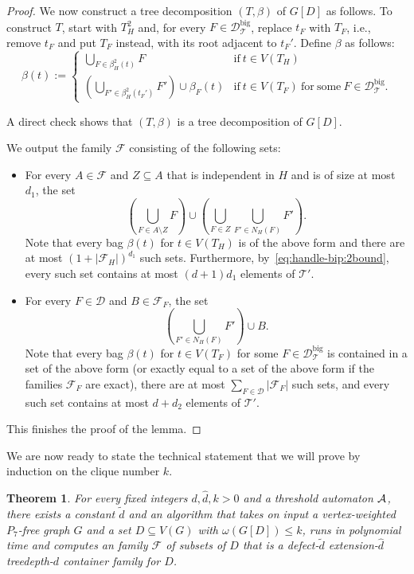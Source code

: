 \documentclass[11pt,a4paper]{article}
\newtheorem{theorem}{Theorem}[section]
\theoremstyle{definition}
\def\T{\mathcal{T}}
\begin{document}
\begin{proof}
We now construct a tree decomposition $(T,\beta)$ of $G[D]$ as follows. 
To construct $T$, start with $T_H^2$ and, for every $F \in \mathcal{D}^\mathrm{big}_\T$, replace $t_F$ with $T_F$, i.e., 
   remove $t_F$ and put $T_F$ instead, with its root adjacent to $t_F'$.
Define $\beta$ as follows:
\[ \beta(t) := \begin{cases} \bigcup_{F \in \beta_H^2(t)} F & \mathrm{if}\ t \in V(T_H) \\
                \left( \bigcup_{F' \in \beta_H^2(t_F')} F' \right) \cup \beta_F(t) & \mathrm{if}\ t \in V(T_F)\ \mathrm{for\ some\ }F \in \mathcal{D}^\mathrm{big}_\T.\end{cases} \]

A direct check shows that $(T,\beta)$ is a tree decomposition of $G[D]$. 

We output the family $\mathcal{F}$ consisting of the following sets:
\begin{itemize}
 \item For every $A \in \mathcal{F}$ and $Z \subseteq A$ that is independent in $H$ and is of size at most $d_1$, the set 
    \[ \left(\bigcup_{F \in A \setminus Z} F\right) \cup  \left(\bigcup_{F \in Z} \bigcup_{F' \in N_H(F)} F' \right). \]
    Note that every bag $\beta(t)$ for $t \in V(T_H)$ is of the above form and there are at most $(1+|\mathcal{F}_H|)^{d_1}$ such sets.
    Furthermore, by~\eqref{eq:handle-bip:2bound}, every such set contains at most
    $(d+1)d_1$ elements of $\T'$. 
 \item For every $F \in \mathcal{D}$ and $B \in \mathcal{F}_F$, the set 
    \[ \left( \bigcup_{F' \in N_H(F)} F' \right) \cup B. \]
    Note that every bag $\beta(t)$ for $t \in V(T_F)$ for some $F \in \mathcal{D}^\mathrm{big}_\T$ is contained in a set of the above form
    (or exactly equal to a set of the above form if the families $\mathcal{F}_F$ are exact),
    there are at most $\sum_{F \in \mathcal{D}} |\mathcal{F}_F|$ such sets,
    and every such set contains at most $d + d_2$ elements of $\T'$.
\end{itemize}
 This finishes the proof of the lemma.
\end{proof}


We are now ready to state the technical statement that we will prove
by induction on the clique number $k$.
\begin{theorem}\label{thm:syf}
For every fixed integers $d,\widehat{d},k > 0$ and a threshold
automaton $\mathcal{A}$, there exists a constant $\widetilde{d}$
and an algorithm 
that takes on input a vertex-weighted $P_7$-free graph $G$ and a set $D \subseteq V(G)$
with $\omega(G[D]) \leq k$,
runs in polynomial time and computes an family $\mathcal{F}$ of subsets
of $D$ that is a defect-$\widetilde{d}$ extension-$\widehat{d}$ treedepth-$d$
container family for $D$.
\end{theorem}
\end{document}

